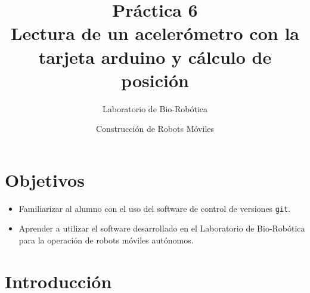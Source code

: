 \documentclass[letterpaper,12pt]{article}
\title{Práctica 6 \\ Lectura de un acelerómetro con la tarjeta arduino y cálculo de posición}
\author{Laboratorio de Bio-Robótica}
\date{Construcción de Robots Móviles}
\begin{document}
\renewcommand{\tablename}{Tabla}
\maketitle
\section*{Objetivos}
\begin{itemize}
\item Familiarizar al alumno con el uso del software de control de versiones \texttt{git}.
\item Aprender a utilizar el software desarrollado en el Laboratorio de Bio-Robótica para la operación de robots móviles autónomos. 
\end{itemize}

\section{Introducción}
\end{document}
